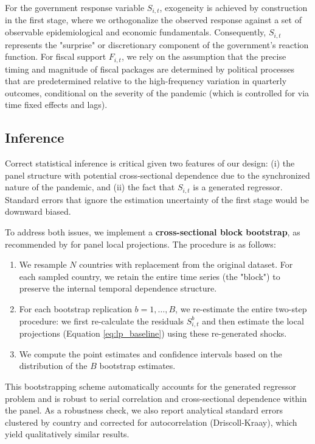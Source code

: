 \documentclass[12pt, a4paper]{article}
\begin{document}
For the government response variable $S_{i,t}$, exogeneity is achieved by construction in the first stage, where we orthogonalize the observed response against a set of observable epidemiological and economic fundamentals. Consequently, $S_{i,t}$ represents the "surprise" or discretionary component of the government's reaction function. For fiscal support $F_{i,t}$, we rely on the assumption that the precise timing and magnitude of fiscal packages are determined by political processes that are predetermined relative to the high-frequency variation in quarterly outcomes, conditional on the severity of the pandemic (which is controlled for via time fixed effects and lags).

\subsection{Inference}

Correct statistical inference is critical given two features of our design: (i) the panel structure with potential cross-sectional dependence due to the synchronized nature of the pandemic, and (ii) the fact that $S_{i,t}$ is a generated regressor. Standard errors that ignore the estimation uncertainty of the first stage would be downward biased.

To address both issues, we implement a \textbf{cross-sectional block bootstrap}, as recommended by \cite{JordaTaylor2025} for panel local projections. The procedure is as follows:
\begin{enumerate}
    \item We resample $N$ countries with replacement from the original dataset. For each sampled country, we retain the entire time series (the "block") to preserve the internal temporal dependence structure.
    \item For each bootstrap replication $b = 1, \dots, B$, we re-estimate the entire two-step procedure: we first re-calculate the residuals $S_{i,t}^b$ and then estimate the local projections (Equation \ref{eq:lp_baseline}) using these re-generated shocks.
    \item We compute the point estimates and confidence intervals based on the distribution of the $B$ bootstrap estimates.
\end{enumerate}
This bootstrapping scheme automatically accounts for the generated regressor problem and is robust to serial correlation and cross-sectional dependence within the panel. As a robustness check, we also report analytical standard errors clustered by country and corrected for autocorrelation (Driscoll-Kraay), which yield qualitatively similar results.
\end{document}
